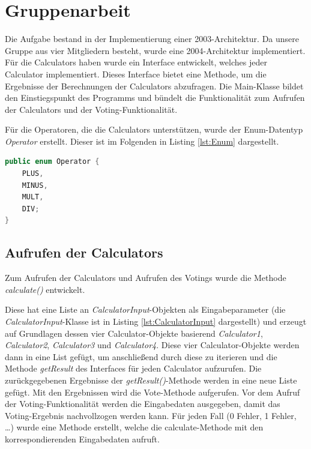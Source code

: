 
\chapter{Gruppenarbeit}\label{cha:Gruppenarbeit}
Die Aufgabe bestand in der Implementierung einer 2003-Architektur. Da unsere Gruppe aus vier Mitgliedern besteht, wurde eine 2004-Architektur implementiert.
Für die Calculators haben wurde ein Interface entwickelt, welches jeder Calculator implementiert.
Dieses Interface bietet eine Methode, um die Ergebnisse der Berechnungen der Calculators abzufragen.
Die Main-Klasse bildet den Einstiegspunkt des Programms und bündelt die Funktionalität zum Aufrufen der Calculators und der Voting-Funktionalität.

Für die Operatoren, die die Calculators unterstützen, wurde der Enum-Datentyp \textit{Operator} erstellt. Dieser ist im Folgenden in Listing \ref{lst:Enum} dargestellt.

\begin{lstlisting}[language=Java,basicstyle=\scriptsize, caption= Enum-Datentyp für die Operanden,label=lst:Enum]
public enum Operator {
    PLUS,
    MINUS,
    MULT,
    DIV;
}
\end{lstlisting}

\section{Aufrufen der Calculators}
Zum Aufrufen der Calculators und Aufrufen des Votings wurde die Methode \textit{calculate()} entwickelt.

Diese hat eine Liste an \textit{CalculatorInput}-Objekten als Eingabeparameter (die \textit{CalculatorInput}-Klasse ist in Listing \ref{lst:CalculatorInput} dargestellt) und erzeugt auf Grundlagen dessen vier Calculator-Objekte basierend \textit{Calculator1}, \textit{Calculator2}, \textit{Calculator3} und \textit{Calculator4}. Diese vier Calculator-Objekte werden dann in eine List gefügt, um anschließend durch diese zu iterieren und die Methode \textit{getResult} des Interfaces für jeden Calculator aufzurufen. Die zurückgegebenen Ergebnisse der \textit{getResult()}-Methode werden in eine neue Liste gefügt. Mit den Ergebnissen wird die Vote-Methode aufgerufen.
Vor dem Aufruf der Voting-Funktionalität werden die Eingabedaten ausgegeben, damit das Voting-Ergebnis nachvollzogen werden kann.
Für jeden Fall (0 Fehler, 1 Fehler, …) wurde eine Methode erstellt, welche die calculate-Methode mit den korrespondierenden Eingabedaten aufruft.

